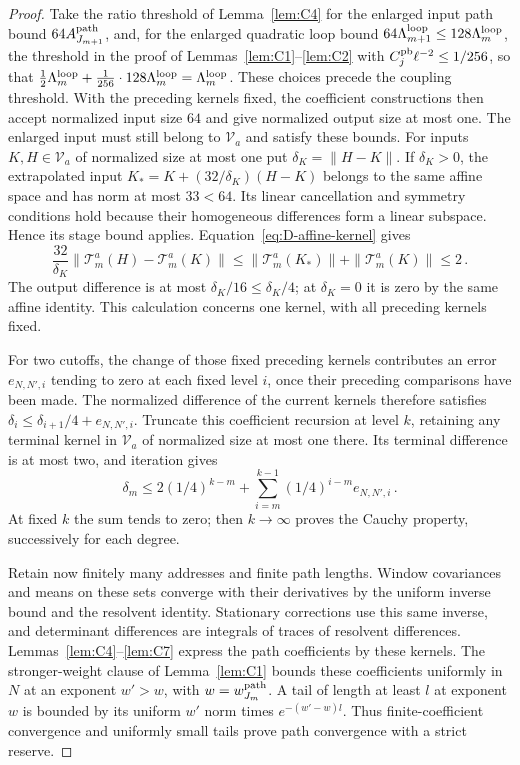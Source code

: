 \begin{proof}
Take the ratio threshold of Lemma~\ref{lem:C4} for the enlarged input path bound $64A_{J_{m+1}}^{\rm path}$, and, for the enlarged quadratic loop bound $64\Lambda_{m+1}^{\rm loop}\le128\Lambda_m^{\rm loop}$, the threshold in the proof of Lemmas~\ref{lem:C1}--\ref{lem:C2} with $C_j^{\rm pb}\ell^{-2}\le1/256$, so that $\tfrac12\Lambda_m^{\rm loop}+\tfrac1{256}\cdot128\Lambda_m^{\rm loop}=\Lambda_m^{\rm loop}$. These choices precede the coupling threshold. With the preceding kernels fixed, the coefficient constructions then accept normalized input size $64$ and give normalized output size at most one. The enlarged input must still belong to $\mathcal V_a$ and satisfy these bounds. For inputs $K,H\in\mathcal V_a$ of normalized size at most one put $\delta_K=\|H-K\|$. If $\delta_K>0$, the extrapolated input $K_* =K+(32/\delta_K)(H-K)$ belongs to the same affine space and has norm at most $33<64$. Its linear cancellation and symmetry conditions hold because their homogeneous differences form a linear subspace. Hence its stage bound applies. Equation~\eqref{eq:D-affine-kernel} gives
\begin{equation*}
\frac{32}{\delta_K}\|\mathcal T_m^a(H)-\mathcal T_m^a(K)\|
\le\|\mathcal T_m^a(K_*)\|+\|\mathcal T_m^a(K)\|\le2\,.
\end{equation*}
The output difference is at most $\delta_K/16\le\delta_K/4$; at $\delta_K=0$ it is zero by the same affine identity. This calculation concerns one kernel, with all preceding kernels fixed.

For two cutoffs, the change of those fixed preceding kernels contributes an error $e_{N,N',i}$ tending to zero at each fixed level $i$, once their preceding comparisons have been made. The normalized difference of the current kernels therefore satisfies $\delta_i\le\delta_{i+1}/4+e_{N,N',i}$. Truncate this coefficient recursion at level $k$, retaining any terminal kernel in $\mathcal V_a$ of normalized size at most one there. Its terminal difference is at most two, and iteration gives
\begin{equation*}
\delta_m\le2(1/4)^{k-m}
+\sum_{i=m}^{k-1}(1/4)^{i-m}e_{N,N',i}\,.
\end{equation*}
At fixed $k$ the sum tends to zero; then $k\to\infty$ proves the Cauchy property, successively for each degree.

Retain now finitely many addresses and finite path lengths. Window covariances and means on these sets converge with their derivatives by the uniform inverse bound and the resolvent identity. Stationary corrections use this same inverse, and determinant differences are integrals of traces of resolvent differences. Lemmas~\ref{lem:C4}--\ref{lem:C7} express the path coefficients by these kernels. The stronger-weight clause of Lemma~\ref{lem:C1} bounds these coefficients uniformly in $N$ at an exponent $w'>w$, with $w=w_{J_m}^{\rm path}$. A tail of length at least $l$ at exponent $w$ is bounded by its uniform $w'$ norm times $e^{-(w'-w)l}$. Thus finite-coefficient convergence and uniformly small tails prove path convergence with a strict reserve.


\end{proof}
